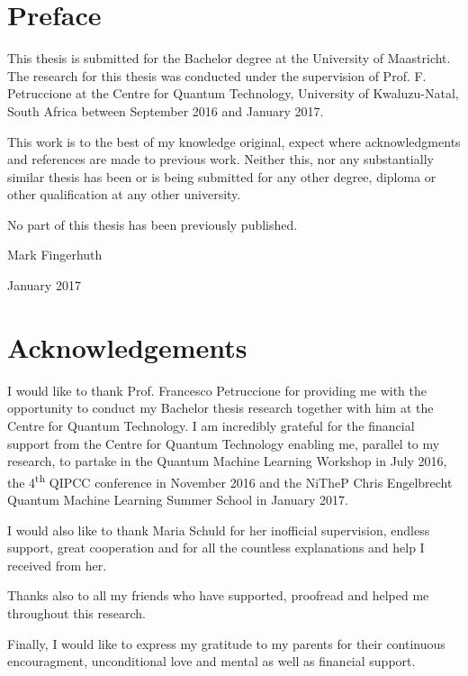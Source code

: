 
\chapter*{Preface}

This thesis is submitted for the Bachelor degree at the University of Maastricht. The research for this thesis was conducted under the supervision of Prof. F. Petruccione at the Centre for Quantum Technology, University of Kwaluzu-Natal, South Africa between September 2016 and January 2017.

This work is to the best of my knowledge original, expect where acknowledgments and references are made to previous work. Neither this, nor any substantially similar thesis has been or is being submitted for any other degree, diploma or other qualification at any other university.

No part of this thesis has been previously published.

\flushright
Mark Fingerhuth

January 2017
\justify
 \cleardoublepage
 
 
 \chapter*{Acknowledgements}

I would like to thank Prof. Francesco Petruccione for providing me with the opportunity to conduct my Bachelor thesis research together with him at the Centre for Quantum Technology. I am incredibly grateful for the financial support from the Centre for Quantum Technology enabling me, parallel to my research, to partake in the Quantum Machine Learning Workshop in July 2016, the 4\textsuperscript{th} QIPCC conference in November 2016 and the NiTheP Chris Engelbrecht Quantum Machine Learning Summer School in January 2017. 

I would also like to thank Maria Schuld for her inofficial supervision, endless support, great cooperation and for all the countless explanations and help I received from her.

Thanks also to all my friends who have supported, proofread and helped me throughout this research.

Finally, I would like to express my gratitude to my parents for their continuous encouragment, unconditional love and mental as well as financial support.

